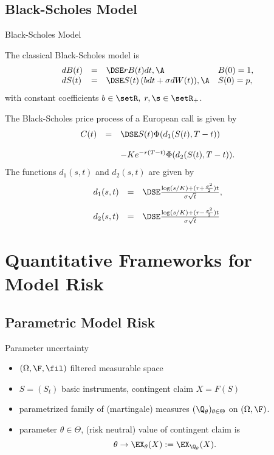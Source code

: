 \subsection{Black-Scholes Model}


{ Black-Scholes Model}

The classical Black-Scholes model is
$$
\begin{array}{llll}
dB(t) &=&\DSE r B(t) dt, \A &B(0)= 1,\\ dS(t) &=&\DSE S(t) \left(
b dt + \sigma dW(t) \right)\!, \A &S(0) = p,
\end{array}
$$
with constant coefficients $b \in \setR,\; r,\s \in \setR_+$.

The Black-Scholes price pro\-cess of a European call is given by
$$
\begin{array}{lll}
C(t) &=&\DSE S(t) \Phi(d_1(S(t), T-t))\\*[12pt] &&- K e^{-r(T-t)}
\Phi(d_2(S(t), T-t)).
\end{array}
$$
The functions $d_1(s,t)$ and $d_2(s,t)$ are given by
$$
\begin{array}{lll}
d_1(s,t) &=&\DSE \frac{\log(s/K) + (r +
\frac{\sigma^2}{2})t}{\sigma \sqrt{t}},\\*[12pt] d_2(s,t) &=&\DSE
 \frac{\log(s/K) + (r -
\frac{\sigma^2}{2})t}{\sigma \sqrt{t}}
\end{array}
$$






\section{Quantitative Frameworks for Model Risk}
\subsection{Parametric Model Risk}

{Parameter uncertainty}
\begin{itemize}
\item $(\Omega, \F, \fil)$ filtered measurable space
\item $S= (S_t)$ basic instruments, contingent claim $X=F(S)$
\item parametrized family of (martingale) measures $(\Q_\theta)_{\theta \in \Theta}$ on $(\Omega, \F)$.
\item parameter $\theta \in \Theta$, (risk neutral) value of contingent claim is
$$
\theta \rightarrow \EX_\theta(X) := \EX_{\Q_\theta}(X).
$$


\end{itemize}




